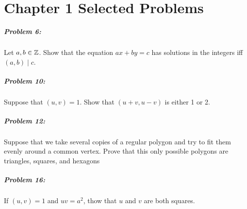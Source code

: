 \chapter*{Chapter 1 Selected Problems}

\paragraph{Problem 6:} Let \(a,b \in \mathbb{Z} \). Show that the equation
\(ax+by =c\) has solutions in the integers iff \((a,b)\mid c\).

\paragraph{Problem 10:} Suppose that \((u,v)=1\). Show that \((u+v,u-v)\) is
either 1 or 2.

\paragraph{Problem 12:} Suppose that we take several copies of a regular polygon
and try to fit them evenly around a common vertex. Prove that this only possible
polygons are triangles, squares, and hexagons

\paragraph{Problem 16:} If \((u,v)=1\) and \(uv=a^2\), thow that \(u\) and \(v\)
are both squares.

